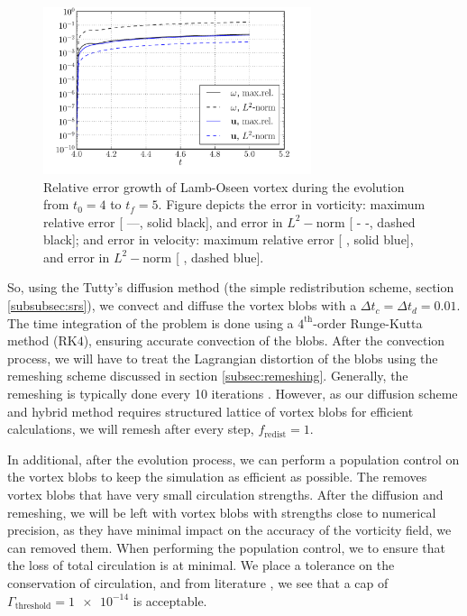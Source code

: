 	\begin{figure}[p]
	\centering
	\includegraphics[width=0.7\textwidth]{figures/lagrangian/lambOseen_convection_errorGrowth_compressed.pdf}
	\caption{Relative error growth of Lamb-Oseen vortex during the evolution from $t_0=4$ to $t_f=5$. Figure depicts the error in vorticity: maximum relative error [ ---, solid black], and error in $L^2-\mathrm{norm}$ [ - -, dashed black]; and error in velocity: maximum relative error [ {\color{plotBlue}{---}}, solid blue], and error in $L^2-\mathrm{norm}$ [ {\color{plotBlue}{- -}}, dashed blue].}
	\label{fig:lambOseen_convection_errorGrowth_compressed}
	\end{figure}

So, using the Tutty's diffusion method (the simple redistribution scheme, section \ref{subsubsec:srs}), we convect and diffuse the vortex blobs with a $\Delta t_c=\Delta t_d = 0.01$. The time integration of the problem is done using a $4^{\mathrm{th}}$-order Runge-Kutta method ($\mathrm{RK4}$), ensuring accurate convection of the blobs. After the convection process, we will have to treat the Lagrangian distortion of the blobs using the remeshing scheme discussed in section \ref{subsec:remeshing}. Generally, the remeshing is typically done every 10 iterations \cite{Barba2004c}. However, as our diffusion scheme and hybrid method requires structured lattice of vortex blobs for efficient calculations, we will remesh after every step, $f_{\mathrm{redist}}=1$.  

In additional, after the evolution process, we can perform a population control on the vortex blobs to keep the simulation as efficient as possible. The  removes vortex blobs that have very small circulation strengths. After the diffusion and remeshing, we will be left with vortex blobs with strengths close to numerical precision, as they have minimal impact on the accuracy of the vorticity field, we can removed them. When performing the population control, we to ensure that the loss of total circulation is at minimal. We place a tolerance on the conservation of circulation, and from literature \cite{Barba2004c}, we see that a cap of $\Gamma_{\mathrm{threshold}}=\num{1e-14}$ is acceptable. 

